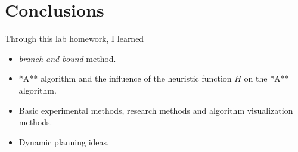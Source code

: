 \documentclass[
]{article}
\begin{document}
\section{Conclusions}

Through this lab homework, I learned

\begin{itemize}
\item
  \emph{branch-and-bound} method.
\item
  *A** algorithm and the influence of the heuristic function \(H\) on
  the *A** algorithm.
\item
  Basic experimental methods, research methods and algorithm
  visualization methods.
\item
  Dynamic planning ideas.
\end{itemize}
\end{document}
